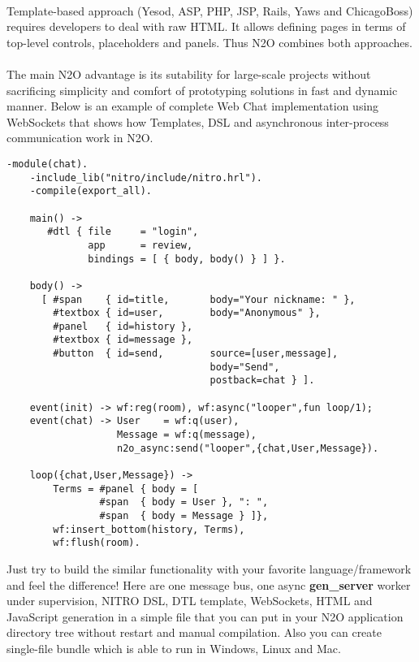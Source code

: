 \paragraph{}
Template-based approach (Yesod, ASP, PHP, JSP, Rails, Yaws and ChicagoBoss)
requires developers to deal with raw HTML. It allows
defining pages in terms of top-level controls, placeholders
and panels. Thus N2O combines both approaches.

\paragraph{}
The main N2O advantage is its sutability for large-scale projects without sacrificing simplicity and comfort of prototyping solutions in fast and dynamic manner.
Below is an example of complete Web Chat implementation using
WebSockets that shows how  Templates, DSL and asynchronous
inter-process communication work in N2O.

\newpage
\vspace{1\baselineskip}
\begin{lstlisting}[caption=chat.erl]
    -module(chat).
    -include_lib("nitro/include/nitro.hrl").
    -compile(export_all).

    main() ->
       #dtl { file     = "login",
              app      = review,
              bindings = [ { body, body() } ] }.

    body() ->
      [ #span    { id=title,       body="Your nickname: " },
        #textbox { id=user,        body="Anonymous" },
        #panel   { id=history },
        #textbox { id=message },
        #button  { id=send,        source=[user,message],
                                   body="Send",
                                   postback=chat } ].

    event(init) -> wf:reg(room), wf:async("looper",fun loop/1);
    event(chat) -> User    = wf:q(user),
                   Message = wf:q(message),
                   n2o_async:send("looper",{chat,User,Message}).

    loop({chat,User,Message}) ->
        Terms = #panel { body = [
                #span  { body = User }, ": ",
                #span  { body = Message } ]},
        wf:insert_bottom(history, Terms),
        wf:flush(room).
\end{lstlisting}
\vspace{1\baselineskip}

Just try to build the similar functionality with your favorite
language/framework and feel the difference! Here are one message bus,
one async {\bf gen\_server} worker under supervision, NITRO DSL, DTL template,
WebSockets, HTML and JavaScript generation in a simple file that you can
put in your N2O application directory tree without restart and
manual compilation. Also you can create single-file bundle
which is able to run in Windows, Linux and Mac.

